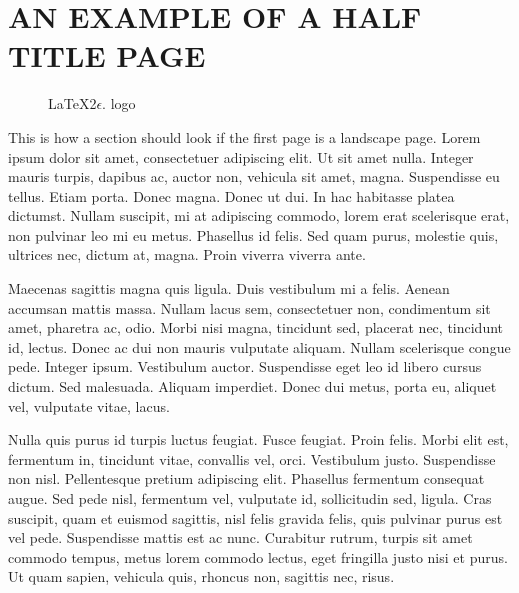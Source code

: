 \chapter{AN EXAMPLE OF A HALF TITLE PAGE}%
\label{appendixB}


\begin{figure}
 \begin{center}
    \caption{\LaTeX 2\ensuremath{\epsilon.} logo}\label{biglogo}
  \end{center}
\end{figure}



This is how a section should look if the first page is a landscape page.
Lorem ipsum dolor sit amet, consectetuer adipiscing elit. Ut sit
amet nulla. Integer mauris turpis, dapibus ac, auctor non, vehicula
sit amet, magna. Suspendisse eu tellus. Etiam porta. Donec magna.
Donec ut dui. In hac habitasse platea dictumst. Nullam suscipit, mi
at adipiscing commodo, lorem erat scelerisque erat, non pulvinar leo
mi eu metus. Phasellus id felis. Sed quam purus, molestie quis,
ultrices nec, dictum at, magna. Proin viverra viverra ante.

Maecenas sagittis magna quis ligula. Duis vestibulum mi a felis.
Aenean accumsan mattis massa. Nullam lacus sem, consectetuer non,
condimentum sit amet, pharetra ac, odio. Morbi nisi magna, tincidunt
sed, placerat nec, tincidunt id, lectus. Donec ac dui non mauris
vulputate aliquam. Nullam scelerisque congue pede. Integer ipsum.
Vestibulum auctor. Suspendisse eget leo id libero cursus dictum. Sed
malesuada. Aliquam imperdiet. Donec dui metus, porta eu, aliquet
vel, vulputate vitae, lacus.

Nulla quis purus id turpis luctus feugiat. Fusce feugiat. Proin
felis. Morbi elit est, fermentum in, tincidunt vitae, convallis vel,
orci. Vestibulum justo. Suspendisse non nisl. Pellentesque pretium
adipiscing elit. Phasellus fermentum consequat augue. Sed pede nisl,
fermentum vel, vulputate id, sollicitudin sed, ligula. Cras
suscipit, quam et euismod sagittis, nisl felis gravida felis, quis
pulvinar purus est vel pede. Suspendisse mattis est ac nunc.
Curabitur rutrum, turpis sit amet commodo tempus, metus lorem
commodo lectus, eget fringilla justo nisi et purus. Ut quam sapien,
vehicula quis, rhoncus non, sagittis nec, risus.

